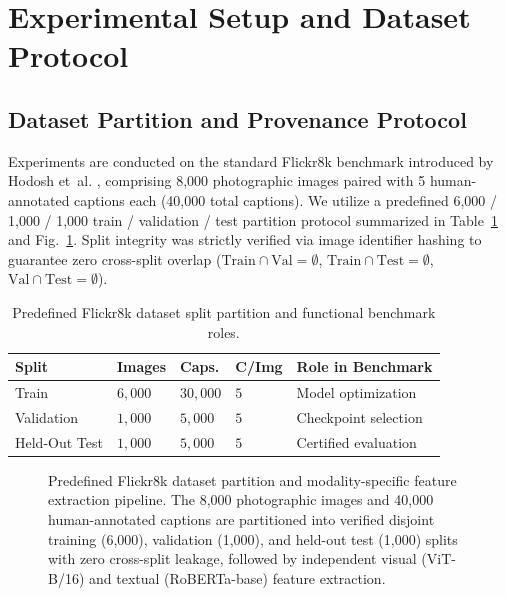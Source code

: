 \documentclass[journal]{IEEEtran}
\begin{document}
\section{Experimental Setup and Dataset Protocol}
\label{sec:experimental_setup}

\subsection{Dataset Partition and Provenance Protocol}
Experiments are conducted on the standard Flickr8k benchmark introduced by Hodosh et~al. \cite{hodosh2013framing}, comprising 8,000 photographic images paired with 5 human-annotated captions each (40,000 total captions). We utilize a predefined 6,000 / 1,000 / 1,000 train / validation / test partition protocol summarized in Table~\ref{tab:dataset_splits} and Fig.~\ref{fig:dataset_pipeline}. Split integrity was strictly verified via image identifier hashing to guarantee zero cross-split overlap ($\text{Train} \cap \text{Val} = \emptyset$, $\text{Train} \cap \text{Test} = \emptyset$, $\text{Val} \cap \text{Test} = \emptyset$).

\begin{table}[!t]
\centering
\scriptsize
\caption{Predefined Flickr8k dataset split partition and functional benchmark roles.}
\label{tab:dataset_splits}
\setlength{\tabcolsep}{2.5pt}
\renewcommand{\arraystretch}{1.08}
\begin{tabularx}{\columnwidth}{@{}>{\raggedright\arraybackslash}p{}>{\raggedleft\arraybackslash}p{}>{\raggedleft\arraybackslash}p{}>{\centering\arraybackslash}p{}>{\raggedright\arraybackslash}X@{}}
\toprule
\textbf{Split} & \textbf{Images} & \textbf{Caps.} & \textbf{C/Img} & \textbf{Role in Benchmark} \\
\midrule
Train & $6{,}000$ & $30{,}000$ & $5$ & Model optimization \\
Validation & $1{,}000$ & $5{,}000$ & $5$ & Checkpoint selection \\
Held-Out Test & $1{,}000$ & $5{,}000$ & $5$ & Certified evaluation \\
\bottomrule
\end{tabularx}
\end{table}

\begin{figure}[!t]
\centering
\HEDODatasetFigure
\caption{Predefined Flickr8k dataset partition and modality-specific feature extraction pipeline. The 8,000 photographic images and 40,000 human-annotated captions are partitioned into verified disjoint training (6,000), validation (1,000), and held-out test (1,000) splits with zero cross-split leakage, followed by independent visual (ViT-B/16) and textual (RoBERTa-base) feature extraction.}
\label{fig:dataset_pipeline}
\end{figure}
\end{document}
